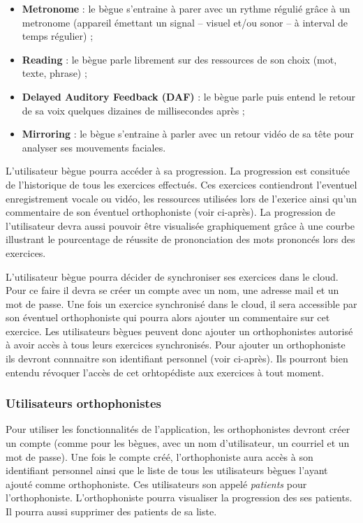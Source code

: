 \begin{itemize}
  \item \textbf{Metronome} : le bègue s'entraine à parer avec un rythme régulié grâce à un metronome (appareil émettant un signal -- visuel et/ou sonor -- à interval de temps régulier) ;
  \item \textbf{Reading} : le bègue parle librement sur des ressources de son choix (mot, texte, phrase) ;
  \item \textbf{Delayed Auditory Feedback (DAF)} : le bègue parle puis entend le retour de sa voix quelques dizaines de millisecondes après ;
  \item \textbf{Mirroring} : le bègue s'entraine à parler avec un retour vidéo de sa tête pour analyser ses mouvements faciales.
\end{itemize}

L'utilisateur bègue pourra accéder à sa progression. La progression est consituée de l'historique de tous les exercices effectués. Ces exercices contiendront l'eventuel enregistrement vocale ou vidéo, les ressources utilisées lors de l'exerice ainsi qu'un commentaire de son éventuel orthophoniste (voir ci-après). La progression de l'utilisateur devra aussi pouvoir être visualisée graphiquement grâce à une courbe illustrant le pourcentage de réussite de prononciation des mots prononcés lors des exercices.

L'utilisateur bègue pourra décider de synchroniser ses exercices dans le cloud. Pour ce faire il devra se créer un compte avec un nom, une adresse mail et un mot de passe. Une fois un exercice synchronisé dans le cloud, il sera accessible par son éventuel orthophoniste qui pourra alors ajouter un commentaire sur cet exercice. Les utilisateurs bègues peuvent donc ajouter un orthophonistes autorisé à avoir accès à tous leurs exercices synchronisés. Pour ajouter un orthophoniste ils devront connnaitre son identifiant personnel (voir ci-après). Ils pourront bien entendu révoquer l'accès de cet orhtopédiste aux exercices à tout moment.

\subsubsection{Utilisateurs orthophonistes}

Pour utiliser les fonctionnalités de l'application, les orthophonistes devront créer un compte (comme pour les bègues, avec un nom d'utilisateur, un courriel et un mot de passe). Une fois le compte créé, l'orthophoniste aura accès à son identifiant personnel ainsi que le liste de tous les utilisateurs bègues l'ayant ajouté comme orthophoniste. Ces utilisateurs son appelé \textit{patients} pour l'orthophoniste. L'orthophoniste pourra visualiser la progression des ses patients. Il pourra aussi supprimer des patients de sa liste.















